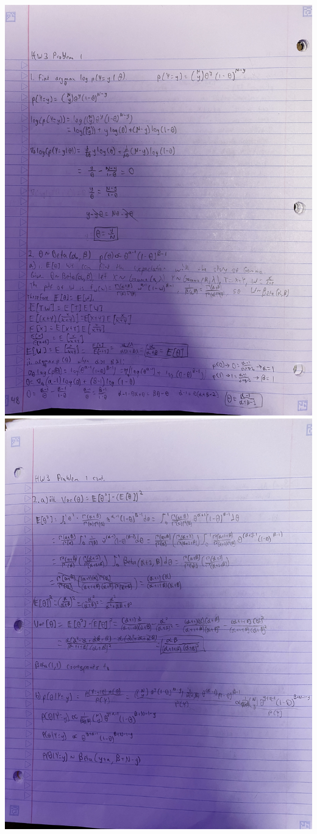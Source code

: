 \documentclass[submit]{harvardml}
\begin{document}
\newpage
\begin{sol}{}
  \begin{center}
    \includegraphics[angle=270,width=0.9\linewidth]{1img1.JPG}
    \includegraphics[angle=270,width=0.9\linewidth]{1img2.JPG}

\end{center}
\end{sol}
\end{document}
